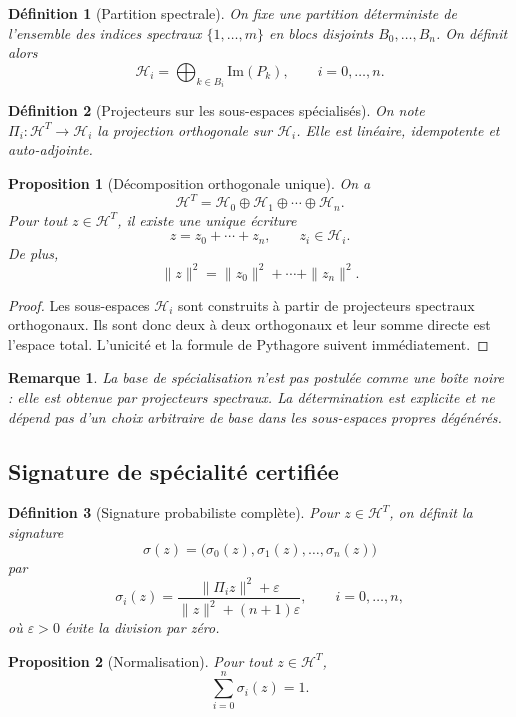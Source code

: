 \documentclass[11pt,a4paper]{article}
\newtheorem{definition}{Définition}[section]
\newtheorem{proposition}{Proposition}[section]
\newtheorem{remark}{Remarque}[section]
\newcommand{\Hh}{\mathcal H}
\newcommand{\1}{\mathbf 1}
\begin{document}
\begin{definition}[Partition spectrale]
On fixe une partition déterministe de l'ensemble des indices spectraux \(\{1,\dots,m\}\) en blocs disjoints \(B_0,\dots,B_n\).  
On définit alors
\[
\Hh_i=\bigoplus_{k\in B_i}\mathrm{Im}(P_k),\qquad i=0,\dots,n.
\]
\end{definition}

\begin{definition}[Projecteurs sur les sous-espaces spécialisés]
On note \(\Pi_i:\Hh^T\to\Hh_i\) la projection orthogonale sur \(\Hh_i\).  
Elle est linéaire, idempotente et auto-adjointe.
\end{definition}

\begin{proposition}[Décomposition orthogonale unique]
On a
\[
\Hh^T=\Hh_0\oplus\Hh_1\oplus\cdots\oplus\Hh_n.
\]
Pour tout \(z\in\Hh^T\), il existe une unique écriture
\[
z=z_0+\cdots+z_n,
\qquad
z_i\in\Hh_i.
\]
De plus,
\[
\|z\|^2=\|z_0\|^2+\cdots+\|z_n\|^2.
\]
\end{proposition}

\begin{proof}
Les sous-espaces \(\Hh_i\) sont construits à partir de projecteurs spectraux orthogonaux.  
Ils sont donc deux à deux orthogonaux et leur somme directe est l'espace total.  
L'unicité et la formule de Pythagore suivent immédiatement.
\end{proof}

\begin{remark}
La base de spécialisation n'est pas postulée comme une boîte noire : elle est obtenue par projecteurs spectraux.  
La détermination est explicite et ne dépend pas d'un choix arbitraire de base dans les sous-espaces propres dégénérés.
\end{remark}

\subsection{Signature de spécialité certifiée}

\begin{definition}[Signature probabiliste complète]
Pour \(z\in\Hh^T\), on définit la signature
\[
\sigma(z)=\bigl(\sigma_0(z),\sigma_1(z),\dots,\sigma_n(z)\bigr)
\]
par
\[
\sigma_i(z)
=
\frac{\|\Pi_i z\|^2+\varepsilon}{\|z\|^2+(n+1)\varepsilon},
\qquad i=0,\dots,n,
\]
où \(\varepsilon>0\) évite la division par zéro.
\end{definition}

\begin{proposition}[Normalisation]
Pour tout \(z\in\Hh^T\),
\[
\sum_{i=0}^n \sigma_i(z)=1.
\]
\end{proposition}
\end{document}
